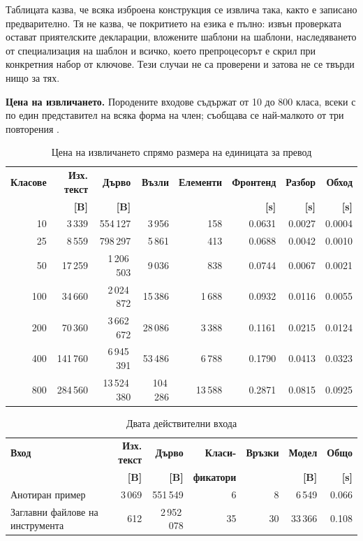 Таблицата казва, че всяка изброена конструкция се извлича така, както е записано предварително. Тя
не казва, че покритието на езика е пълно: извън проверката остават приятелските декларации,
вложените шаблони на шаблони, наследяването от специализация на шаблон и всичко, което
препроцесорът е скрил при конкретния набор от ключове. Тези случаи не са проверени и затова не се
твърди нищо за тях.

\textbf{Цена на извличането.} Породените входове съдържат от 10 до 800 класа, всеки с по един представител на всяка форма на
член; съобщава се най-малкото от три повторения .

\begin{table}[H]
\caption{Цена на извличането спрямо размера на единицата за превод}
\label{tab:cost}
\centering
{}
\fontsize{10}{12}\selectfont
\begin{tabular}{@{}rrrrrrrr@{}}
\toprule
\textbf{Класове} & \textbf{Изх. текст} & \textbf{Дърво} & \textbf{Възли} & \textbf{Елементи} &
\textbf{Фронтенд} & \textbf{Разбор} & \textbf{Обход} \\
 & \textbf{[B]} & \textbf{[B]} & & & \textbf{[s]} & \textbf{[s]} & \textbf{[s]} \\
\midrule
 10 &   3\,339 &      554\,127 &    3\,956 &    158 & 0.0631 & 0.0027 & 0.0004 \\
 25 &   8\,559 &      798\,297 &    5\,861 &    413 & 0.0688 & 0.0042 & 0.0010 \\
 50 &  17\,259 &   1\,206\,503 &    9\,036 &    838 & 0.0744 & 0.0067 & 0.0021 \\
100 &  34\,660 &   2\,024\,872 &   15\,386 & 1\,688 & 0.0932 & 0.0116 & 0.0055 \\
200 &  70\,360 &   3\,662\,672 &   28\,086 & 3\,388 & 0.1161 & 0.0215 & 0.0124 \\
400 & 141\,760 &   6\,945\,391 &   53\,486 & 6\,788 & 0.1790 & 0.0413 & 0.0323 \\
800 & 284\,560 &  13\,524\,380 &  104\,286 & 13\,588 & 0.2871 & 0.0815 & 0.0925 \\
\bottomrule
\end{tabular}
\end{table}

\begin{table}[H]
\caption{Двата действителни входа}
\label{tab:realinputs}
\centering
{}
\fontsize{10}{12}\selectfont
\begin{tabular}{@{}L{3.4cm}rrrrrr@{}}
\toprule
\textbf{Вход} & \textbf{Изх. текст} & \textbf{Дърво} & \textbf{Класи-} & \textbf{Връзки} &
\textbf{Модел} & \textbf{Общо} \\
 & \textbf{[B]} & \textbf{[B]} & \textbf{фикатори} & & \textbf{[B]} & \textbf{[s]} \\
\midrule
Анотиран пример & 3\,069 & 551\,549 & 6 & 8 & 6\,549 & 0.066 \\
Заглавни файлове на инструмента & 612 & 2\,952\,078 & 35 & 30 & 33\,366 & 0.108 \\
\bottomrule
\end{tabular}
\end{table}

